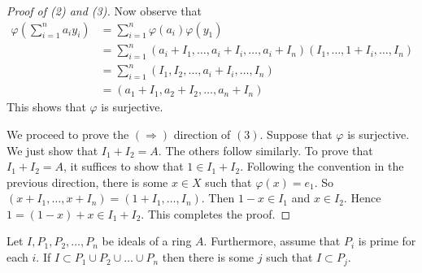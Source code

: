\begin{proof}[Proof of (2) and (3)]
    Now observe that
    \begin{align*}
	\varphi \left( \sum_{i=1}^{n} a_i y_i \right) &= \sum_{i=1}^{n} \varphi (a_i) \varphi (y_1) \\
	&= \sum_{i=1}^{n} \left( a_i + I_1 , \ldots , a_i +I_i, \ldots , a_i +I_n \right) \left( I_1, \ldots , 1+I_i , \ldots , I_n \right) \\
	&= \sum_{i=1}^n \left( I_1 , I_2 , \ldots, a_i +I_i , \ldots, I_n \right) \\
	&= \left( a_1 + I_1 , a_2 + I_2 ,\ldots , a_n + I_n \right)
    \end{align*}
    This shows that $\varphi$ is surjective.

    We proceed to prove the $\left( \Rightarrow \right)$ direction of $(3)$.  Suppose that $\varphi$ is surjective. We just show that $I_1 + I_2 = A$. The others follow similarly. To prove that $I_1 + I_2 = A$, it suffices to show that $1\in I_1 +I_2$. Following the convention in the previous direction, there is some $x\in X$ such that $\varphi (x) =e_1$. So $\left( x+I_1 , \ldots , x+I_n \right) = \left( 1+I_1 , \ldots , I_n \right)$. Then $1-x\in I_1$ and $x \in I_2$. Hence $1= (1-x)+ x\in I_1 + I_2$. This completes the proof.
\end{proof}

\begin{lemma}
    Let $I, P_1, P_2, \ldots, P_n$ be ideals of a ring $A$. Furthermore, assume that $P_i$ is prime for each $i$. If $I \subset P_1 \cup P_2 \cup \ldots \cup P_n$ then there is some $j$ such that $I \subset P_j$.
    \label{lemma:prime-avoidance}
\end{lemma}
